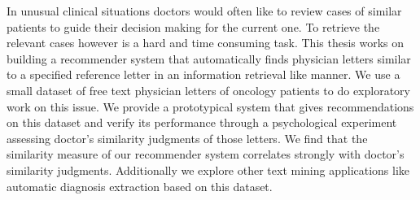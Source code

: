 \documentclass[Thesis.tex]{subfiles}
\begin{document}
\setlength{\parindent}{0cm}
In unusual clinical situations doctors would often like to review cases of similar patients to guide their decision making for the current one. To retrieve the relevant cases however is a hard and time consuming task. This thesis works on building a recommender system that automatically finds physician letters similar to a specified reference letter in an information retrieval like manner. We use a small dataset of free text physician letters of oncology patients to do exploratory work on this issue. We provide a prototypical system that gives recommendations on this dataset and verify its performance through a psychological experiment assessing doctor's similarity judgments of those letters. We find that the similarity measure of our recommender system correlates strongly with doctor's similarity judgments. Additionally we explore other text mining applications like automatic diagnosis extraction based on this dataset.
\end{document}
